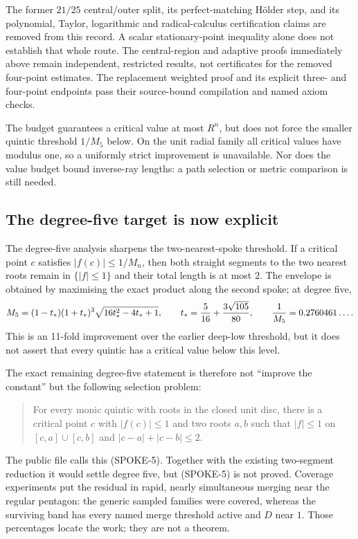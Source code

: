 The former $21/25$ central/outer split, its perfect-matching H\"older step,
and its polynomial, Taylor, logarithmic and radical-calculus certification
claims are removed from this record. A scalar stationary-point inequality
alone does not establish that whole route. The central-region and adaptive
proofs immediately above remain independent, restricted results, not
certificates for the removed four-point estimates. The replacement weighted
proof and its explicit three- and four-point endpoints pass their source-bound
compilation and named axiom checks.

The budget guarantees a critical value at most $R^n$, but does not force
the smaller quintic threshold $1/M_5$ below.  On the unit radial family all
critical values have modulus one, so a uniformly strict improvement is
unavailable.  Nor does the value budget bound inverse-ray lengths: a path
selection or metric comparison is still needed.

\subsection*{The degree-five target is now explicit}

The degree-five analysis sharpens the two-nearest-spoke threshold.  If a
critical point $c$ satisfies $|f(c)|\le1/M_n$, then both straight segments to
the two nearest roots remain in $\{|f|\le1\}$ and their total length is at
most $2$.  The envelope is obtained by maximising the exact product along the
second spoke; at degree five,
\[
 M_5=(1-t_*)(1+t_*)^3\sqrt{16t_*^2-4t_*+1},
 \qquad
 t_*={5\over16}+{3\sqrt{105}\over80},
 \qquad
 {1\over M_5}=0.2760461\ldots.
\]
This is an 11-fold improvement over the earlier deep-low threshold, but it
does not assert that every quintic has a critical value below this level.

The exact remaining degree-five statement is therefore not ``improve the
constant'' but the following selection problem:
\begin{quote}
For every monic quintic with roots in the closed unit disc, there is a
critical point $c$ with $|f(c)|\le1$ and two roots $a,b$ such that
$|f|\le1$ on $[c,a]\cup[c,b]$ and
$|c-a|+|c-b|\le2$.
\end{quote}
The public file calls this (SPOKE-5).  Together with the existing
two-segment reduction it would settle degree five, but (SPOKE-5) is not
proved.  Coverage experiments put the residual in rapid, nearly simultaneous
merging near the regular pentagon: the generic sampled families were covered,
whereas the surviving band has every named merge threshold active and
$D$ near $1$.  Those percentages locate the work; they are not a theorem.

